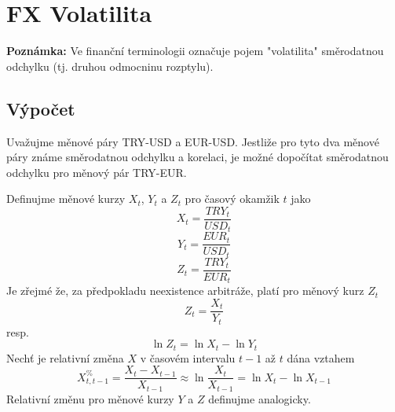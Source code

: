 \documentclass[a4paper]{book}
\begin{document}
\chapter{FX Volatilita}

\textbf{Poznámka:} Ve finanční terminologii označuje pojem "volatilita" směrodatnou odchylku (tj. druhou odmocninu rozptylu).

\section{Výpočet}

Uvažujme měnové páry TRY-USD a EUR-USD. Jestliže pro tyto dva měnové páry známe směrodatnou odchylku a korelaci, je možné dopočítat směrodatnou odchylku pro měnový pár TRY-EUR.

Definujme měnové kurzy $X_t$, $Y_t$ a $Z_t$ pro časový okamžik $t$ jako
\begin{equation*}
X_t = \frac{TRY_t}{USD_t} 
\end{equation*}
\begin{equation*}
Y_t = \frac{EUR_t}{USD_t}
\end{equation*}
\begin{equation*}
Z_t = \frac{TRY_t}{EUR_t}
\end{equation*}
Je zřejmé že, za předpokladu neexistence arbitráže, platí pro měnový kurz $Z_t$
\begin{equation*}
Z_t = \frac{X_t}{Y_t}
\end{equation*}
resp.
\begin{equation*}
\ln Z_t = \ln X_t - \ln Y_t
\end{equation*}
Nechť je relativní změna $X$ v časovém intervalu $t-1$ až $t$ dána vztahem
\begin{equation*}
X^{\%}_{t, t-1} = \frac{X_t - X_{t-1}}{X_{t-1}} \approx \ln \frac{X_t}{X_{t-1}} = \ln X_t - \ln X_{t-1}
\end{equation*}
Relativní změnu pro měnové kurzy $Y$ a $Z$ definujme analogicky.
\end{document}
